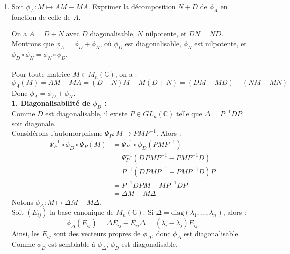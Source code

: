 \documentclass[a4paper,12pt]{article}
\begin{document}
\begin{enumerate}
    \item Soit \( \phi_{A} : M \mapsto AM - MA \). Exprimer la décomposition \( N + D \) de \( \phi_{A} \) en fonction de celle de \( A \).
    
    \begin{correctionbox}
        On a \( A = D + N \) avec \( D \) diagonalisable, \( N \) nilpotente, et \( DN = ND \). \\[2pt]
        Montrons que \( \phi_A = \phi_D + \phi_N \), où \( \phi_D \) est diagonalisable, \( \phi_N \) est nilpotente, et \( \phi_D \circ \phi_N = \phi_N \circ \phi_D \). \\\\
        Pour toute matrice \( M \in M_n(\mathbb{C}) \), on a :
        \[
        \phi_A(M) = AM - MA = (D + N)M - M(D + N) = (DM - MD) + (NM - MN) 
        \]
        Donc \( \phi_A = \phi_D + \phi_N \). \\[2pt]
        
        \textbf{1. Diagonalisabilité de \( \phi_D \) :} \\[2pt]
        Comme \( D \) est diagonalisable, il existe \( P \in GL_n(\mathbb{C}) \) telle que \( \Delta = P^{-1}DP \) soit diagonale. \\[2pt]
        Considérons l'automorphisme \( \Psi_P : M \mapsto PMP^{-1} \). Alors :
        \begin{align*}
            \Psi_P^{-1} \circ \phi_D \circ \Psi_P (M) &= \Psi_P^{-1} \circ \phi_D(PMP^{-1}) \\
            &= \Psi_P^{-1}(DPMP^{-1} - PMP^{-1}D) \\
            &= P^{-1}(DPMP^{-1} - PMP^{-1}D)P \\
            &= P^{-1}DPM - MP^{-1}DP \\
            &= \Delta M - M\Delta
        \end{align*}
        Notons \( \phi_\Delta : M \mapsto \Delta M - M\Delta \). \\[2pt]
        Soit \( (E_{ij}) \) la base canonique de \( M_n(\mathbb{C}) \). Si \( \Delta = \mathrm{diag}(\lambda_1, \dots, \lambda_n) \), alors :
        \[
        \phi_\Delta(E_{ij}) = \Delta E_{ij} - E_{ij} \Delta = (\lambda_i - \lambda_j) E_{ij}
        \]
        Ainsi, les \( E_{ij} \) sont des vecteurs propres de \( \phi_\Delta \), donc \( \phi_\Delta \) est diagonalisable. \\[2pt]
        Comme \( \phi_D \) est semblable à \( \phi_\Delta \), \( \phi_D \) est diagonalisable. \\[2pt]
        

\end{correctionbox}
\end{enumerate}
\end{document}
